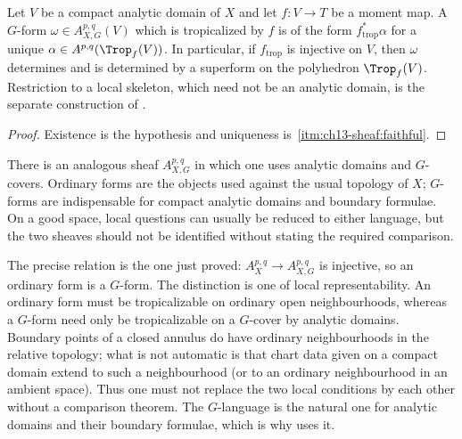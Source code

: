 \begin{corollary}
\label{cor:ch13-recognition}
Let $V$ be a compact analytic domain of $X$ and let $f:V\to T$ be a moment
map.  A $G$-form $\omega\in A^{p,q}_{X,G}(V)$ which is tropicalized by $f$
is of the form $f_{\mathrm{trop}}^*\alpha$ for a unique
$\alpha\in A^{p,q}(\Trop_f(V))$.  In particular, if $f_{\mathrm{trop}}$ is
injective on $V$, then $\omega$ determines and is determined by a
superform on the polyhedron $\Trop_f(V)$.  Restriction to a local skeleton,
which need not be an analytic domain, is the separate construction of
.
\end{corollary}

\begin{proof}
Existence is the hypothesis and uniqueness is
\,\cref{itm:ch13-sheaf:faithful}.
\end{proof}

There is an analogous sheaf $A_{X,G}^{p,q}$ in which one uses analytic
domains and $G$-covers.  Ordinary forms are the objects used against the
usual topology of $X$; $G$-forms are indispensable for compact analytic
domains and boundary formulae.  On a good space, local questions can usually
be reduced to either language, but the two sheaves should not be identified
without stating the required comparison.

The precise relation is the one just proved: $A^{p,q}_X\to A^{p,q}_{X,G}$ is
injective, so an ordinary form is a $G$-form.  The distinction is one of local
representability.  An ordinary form must be tropicalizable on ordinary open
neighbourhoods, whereas a $G$-form need only be tropicalizable on a
$G$-cover by analytic domains.  Boundary points of a closed annulus do have
ordinary neighbourhoods in the relative topology; what is not automatic is
that chart data given on a compact domain extend to such a neighbourhood (or
to an ordinary neighbourhood in an ambient space).  Thus one must not replace
the two local conditions by each other without a comparison theorem.  The
$G$-language is the natural one for analytic domains and their boundary
formulae, which is why  uses it.

